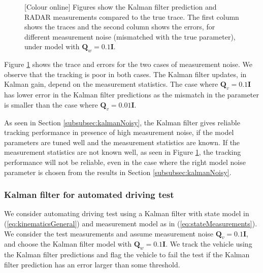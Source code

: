 \documentclass[11pt]{article}
\newcommand{\bI}{\mathbf{I}}
\newcommand{\bQ}{\mathbf{Q}}
\begin{document}
\begin{figure}[h]
\caption{[Colour online] Figures show the Kalman filter prediction and RADAR measurements compared to the true trace. The first column shows the traces and the second column shows the errors, for different measurement noise (mismatched with the true parameter), under model with $\bQ_{w}=0.1\bI$.}
\label{fig:TraceVelPosHighMis}
\end{figure}

Figure \ref{fig:TraceVelPosHighMis} shows the trace and errors for the two cases of measurement noise. We observe that the tracking is poor in both cases. The Kalman filter updates, in Kalman gain, depend on the measurement statistics. The case where $\bQ_{v}=0.1\bI$ has lower error in the Kalman filter predictions as the mismatch in the parameter is smaller than the case where $\bQ_{v}=0.01\bI$.

As seen in Section \ref{subsubsec:kalmanNoisy}, the Kalman filter gives reliable tracking performance in presence of high measurement noise, if the model parameters are tuned well and the measurement statistics are known. If the measurement statistics are not known well, as seen in Figure \ref{fig:TraceVelPosHighMis}, the tracking performance will not be reliable, even in the case where the right model noise parameter is chosen from the results in Section \ref{subsubsec:kalmanNoisy}.



\subsubsection{Kalman filter for automated driving test}
\label{subsubsec:kalmanTest}

We consider automating driving test using a Kalman filter with state model in (\ref{eq:kinematicsGeneral}) and measurement model as in (\ref{eq:stateMeasurements}). We consider the test measurements and assume measurement noise $\bQ_{v}=0.1\bI$, and choose the Kalman filter model with $\bQ_{w}=0.1\bI$. We track the vehicle using the Kalman filter predictions and flag the vehicle to fail the test if the Kalman filter prediction has an error larger than some threshold.
\end{document}
